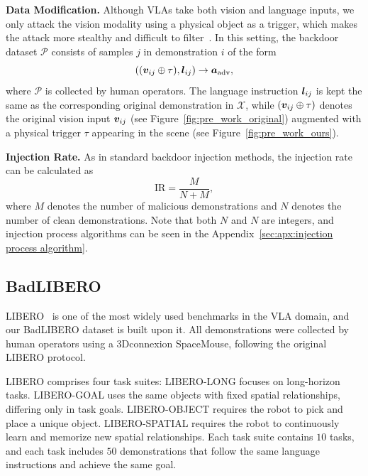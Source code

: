 \documentclass{article} %
\begin{document}
\textbf{Data Modification.} Although VLAs take both vision and language inputs, we only attack the vision modality using a physical object as a trigger, which makes the attack more stealthy and difficult to filter~\citep{lou2023trojtext}. In this setting, the backdoor dataset $\mathcal{P}$ consists of samples $j$ in demonstration $i$ of the form 
\begin{equation}
    (({\bm{v}}_{ij} \oplus \tau), {\bm{l}}_{ij}) \rightarrow {\bm{a}}_{\text{adv}},
\end{equation}
where $\mathcal{P}$ is collected by human operators. The language instruction ${\bm{l}}_{ij}$ is kept the same as the corresponding original demonstration in $\mathcal{X}$, while $({\bm{v}}_{ij} \oplus \tau)$ denotes the original vision input ${\bm{v}}_{ij}$ (see Figure~\ref{fig:pre_work_original}) augmented with a physical trigger $\tau$ appearing in the scene (see Figure~\ref{fig:pre_work_ours}). 

\textbf{Injection Rate.} As in standard backdoor injection methods, the injection rate can be calculated as 
\begin{equation}
\label{eq: injection rate}
    \text{IR}=\frac{M}{N + M},
\end{equation}
where $M$ denotes the number of malicious demonstrations and $N$ denotes the number of clean demonstrations. Note that both $N$ and $N$ are integers, and injection process algorithms can be seen in the Appendix~\ref{sec:apx:injection process algorithm}.

\subsection{BadLIBERO}
\label{sec:badlibero}

LIBERO~\citep{liu2023libero} is one of the most widely used benchmarks in the VLA domain, and our BadLIBERO dataset is built upon it. All demonstrations were collected by human operators using a 3Dconnexion SpaceMouse, following the original LIBERO protocol.

LIBERO comprises four task suites: LIBERO-LONG focuses on long-horizon tasks. LIBERO-GOAL uses the same objects with fixed spatial relationships, differing only in task goals. LIBERO-OBJECT requires the robot to pick and place a unique object. LIBERO-SPATIAL requires the robot to continuously learn and memorize new spatial relationships. Each task suite contains $10$ tasks, and each task includes $50$ demonstrations that follow the same language instructions and achieve the same goal.
\end{document}
